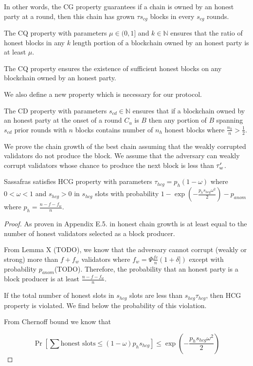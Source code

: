 In other words, the CG property guarantees if a chain is owned by an honest party at a round, then this chain has grown $ \tau s_{cg}$ blocks in every $ s_{cg} $ rounds. 

\begin{definition}\label{def:cq}
	The CQ property with parameters $ \mu \in (0,1]  $ and $ k \in \mathbb{N} $ ensures that the ratio of honest blocks in any $ k $ length portion of a blockchain owned by an honest party is at least $ \mu $.
\end{definition} 

The CQ property ensures the existence of sufficient honest blocks on  any blockchain owned by an honest party.

We also define a new property which is necessary for our protocol.
\begin{definition}
	\label{def:cd}
	The CD property with parameters $s_{cd} \in \mathbb{N}$ ensures that  if a blockchain owned by an honest party at the onset of a round $ C_u $ is $ B $ then any portion of  $B$ spanning $s_{cd}$ prior rounds with $n$ blocks  contains  number of $n_h$ honest blocks  where $\frac{n_h}{n}> \frac{1}{2}$.
\end{definition}


We prove the chain growth of the best chain assuming that the weakly corrupted validators do not produce the block. We assume that the adversary can weakly corrupt validators whose chance to produce the next block is less than $ \tau_w' $.



\begin{theorem}
	Sassafras satisfies HCG property with parameters $\tau_{hcg} = p_h(1-\omega)$ where $0 < \omega < 1$ and $s_{hcg} > 0$ in $s_{hcg}$ slots  with probability $1-\exp(-\frac{ p_h s_{hcg} \omega^2}{2}) - p_{anom}$ where $ p_h = \frac{n - f - f_w}{n} $.
\end{theorem}
\begin{proof}
	As proven in  Appendix E.5. in \cite{genesis} honest chain growth is at least equal to the number of honest validators selected as a block producer.
	
	From Lemma X (TODO), we know that the adversary cannot corrupt (weakly or strong) more than $f + f_w $ validators where $ f_w  =  \Psi\frac{fc}{n}(1+\delta])$ except with probability $ p_{anom} $(TODO).
	Therefore, the probability that an honest party is a block producer is at least $ \frac{n - f - f_w}{n} $.
	
	If the total number of honest slots in $ s_{hcg} $ slots are less than  $s_{hcg}\tau_{hcg}$, then HCG property is violated. 
	We find below the probability of this violation. 
	
	From Chernoff bound we know that
	
	$$\Pr[\sum \text{honest slots} \leq  (1-\omega) p_h s_{hcg}] \leq \exp(-\frac{p_h s_{hcg} \omega^2}{2})$$
	
\end{proof}


\begin{theorem}
\end{theorem}



